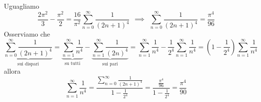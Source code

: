 Uguagliamo
\begin{equation*}
\frac{2\pi^{2}}{3} - \frac{\pi^{2}}{2} = \frac{16}{\pi^{2}}\sum\limits^{\infty}_{n = 0}\frac{1}{(2n + 1)^{4}} \ \ \implies \ \ \sum\limits^{\infty}_{n = 0}\frac{1}{(2n + 1)^{4}} = \frac{\pi^{4}}{96}
\end{equation*}
Osserviamo che
\begin{equation*}
\underbrace{\sum\limits^{\infty}_{n = 0}\frac{1}{(2n + 1)^{4}}}_{\text{sui dispari}} = \underbrace{\sum\limits^{\infty}_{n = 1}\frac{1}{n^{4}}}_{\text{su tutti}} - \underbrace{\sum\limits^{\infty}_{n = 1}\frac{1}{(2n)^{4}}}_{\text{sui pari}} = \sum\limits^{\infty}_{n = 1}\frac{1}{n^{4}} - \frac{1}{2^{4}}\sum\limits^{\infty}_{n = 1}\frac{1}{n^{4}} = \left(1 - \frac{1}{2^{4}}\right)\sum\limits^{\infty}_{n = 1}\frac{1}{n^{4}}
\end{equation*}
allora
\begin{equation*}
\sum\limits^{\infty}_{n = 1}\frac{1}{n^{4}} = \frac{\sum\limits^{\infty}_{n = 0}\frac{1}{(2n + 1)^{4}}}{1 - \frac{1}{2^{4}}} = \frac{\frac{\pi^{4}}{96}}{1 - \frac{1}{2^{4}}} = \frac{\pi^{4}}{90}
\end{equation*}
\Soluzione

